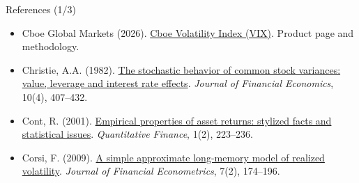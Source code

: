 \begin{frame}{References (1/3)}
\begin{itemize}
    \item Cboe Global Markets (2026). \href{https://www.cboe.com/tradable_products/vix/}{Cboe Volatility Index (VIX)}. Product page and methodology.
    \item Christie, A.A. (1982). \href{https://doi.org/10.1016/0304-405X(82)90018-6}{The stochastic behavior of common stock variances: value, leverage and interest rate effects}. \textit{Journal of Financial Economics}, 10(4), 407--432.
    \item Cont, R. (2001). \href{https://doi.org/10.1080/713665670}{Empirical properties of asset returns: stylized facts and statistical issues}. \textit{Quantitative Finance}, 1(2), 223--236.
    \item Corsi, F. (2009). \href{https://doi.org/10.1093/jjfinec/nbp001}{A simple approximate long-memory model of realized volatility}. \textit{Journal of Financial Econometrics}, 7(2), 174--196.
\end{itemize}
\end{frame}

